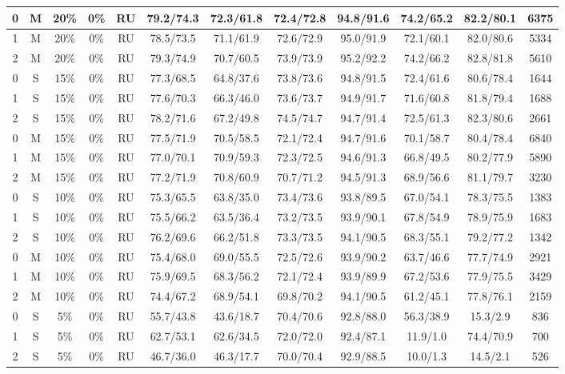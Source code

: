 \begin{table*}
{\begin{tabular}{|c|c|c|c|c||c|c|c|c|c|c||c|}
0 & M & 20\% & 0\% & RU & 79.2/74.3 & 72.3/61.8 & 72.4/72.8 & 94.8/91.6 & 74.2/65.2 & 82.2/80.1 & 6375 \\ \hline
1 & M & 20\% & 0\% & RU & 78.5/73.5 & 71.1/61.9 & 72.6/72.9 & 95.0/91.9 & 72.1/60.1 & 82.0/80.6 & 5334 \\ \hline
2 & M & 20\% & 0\% & RU & 79.3/74.9 & 70.7/60.5 & 73.9/73.9 & 95.2/92.2 & 74.2/66.2 & 82.8/81.8 & 5610 \\ \hline
0 & S & 15\% & 0\% & RU & 77.3/68.5 & 64.8/37.6 & 73.8/73.6 & 94.8/91.5 & 72.4/61.6 & 80.6/78.4 & 1644 \\ \hline
1 & S & 15\% & 0\% & RU & 77.6/70.3 & 66.3/46.0 & 73.6/73.7 & 94.9/91.7 & 71.6/60.8 & 81.8/79.4 & 1688 \\ \hline
2 & S & 15\% & 0\% & RU & 78.2/71.6 & 67.2/49.8 & 74.5/74.7 & 94.7/91.4 & 72.5/61.3 & 82.3/80.6 & 2661 \\ \hline
0 & M & 15\% & 0\% & RU & 77.5/71.9 & 70.5/58.5 & 72.1/72.4 & 94.7/91.6 & 70.1/58.7 & 80.4/78.4 & 6840 \\ \hline
1 & M & 15\% & 0\% & RU & 77.0/70.1 & 70.9/59.3 & 72.3/72.5 & 94.6/91.3 & 66.8/49.5 & 80.2/77.9 & 5890 \\ \hline
2 & M & 15\% & 0\% & RU & 77.2/71.9 & 70.8/60.9 & 70.7/71.2 & 94.5/91.3 & 68.9/56.6 & 81.1/79.7 & 3230 \\ \hline
0 & S & 10\% & 0\% & RU & 75.3/65.5 & 63.8/35.0 & 73.4/73.6 & 93.8/89.5 & 67.0/54.1 & 78.3/75.5 & 1383 \\ \hline
1 & S & 10\% & 0\% & RU & 75.5/66.2 & 63.5/36.4 & 73.2/73.5 & 93.9/90.1 & 67.8/54.9 & 78.9/75.9 & 1683 \\ \hline
2 & S & 10\% & 0\% & RU & 76.2/69.6 & 66.2/51.8 & 73.3/73.5 & 94.1/90.5 & 68.3/55.1 & 79.2/77.2 & 1342 \\ \hline
0 & M & 10\% & 0\% & RU & 75.4/68.0 & 69.0/55.5 & 72.5/72.6 & 93.9/90.2 & 63.7/46.6 & 77.7/74.9 & 2921 \\ \hline
1 & M & 10\% & 0\% & RU & 75.9/69.5 & 68.3/56.2 & 72.1/72.4 & 93.9/89.9 & 67.2/53.6 & 77.9/75.5 & 3429 \\ \hline
2 & M & 10\% & 0\% & RU & 74.4/67.2 & 68.9/54.1 & 69.8/70.2 & 94.1/90.5 & 61.2/45.1 & 77.8/76.1 & 2159 \\ \hline
0 & S & 5\% & 0\% & RU & 55.7/43.8 & 43.6/18.7 & 70.4/70.6 & 92.8/88.0 & 56.3/38.9 & 15.3/2.9 & 836 \\ \hline
1 & S & 5\% & 0\% & RU & 62.7/53.1 & 62.6/34.5 & 72.0/72.0 & 92.4/87.1 & 11.9/1.0 & 74.4/70.9 & 700 \\ \hline
2 & S & 5\% & 0\% & RU & 46.7/36.0 & 46.3/17.7 & 70.0/70.4 & 92.9/88.5 & 10.0/1.3 & 14.5/2.1 & 526 \\ \hline

\end{tabular}}
\end{table*}
